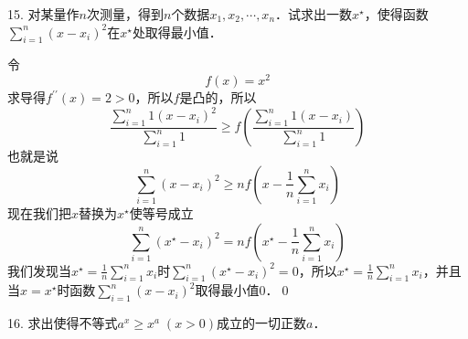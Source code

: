 15. 对某量作$n$次测量，得到$n$个数据$x_1,x_2,\cdots, x_n$．试求出一数$x^\star$，使得函数$\displaystyle\sum_{i=1}^n \left(x- x_i\right)^2$在$x^\star$处取得最小值．

\solve 令
\begin{equation}
    f(x) = x^2
\end{equation}
求导得$f^{\prime\prime}(x)=2>0$，所以$f$是凸的，所以
\begin{equation}
    \frac{\displaystyle\sum_{i=1}^n 1 \left(x-x_i\right)^2}{\displaystyle\sum_{i=1}^n 1} \geq f \left(\displaystyle\frac{\displaystyle\sum_{i=1}^n 1 \left(x-x_i\right)}{\displaystyle\sum_{i=1}^n 1}\right)
\end{equation}
也就是说
\begin{equation}
    \sum_{i=1}^n \left( x - x_i\right)^2 \geq n f(x - \frac{1}{n}\displaystyle\sum_{i=1}^n x_i)
\end{equation}
现在我们把$x$替换为$x^\star$使等号成立
\begin{equation}
    \sum_{i=1}^n \left(x^\star - x_i\right)^2 = n f \left(x^\star - \frac{1}{n} \displaystyle\sum_{i=1}^n x_i\right)
\end{equation}
我们发现当$x^\star = \displaystyle\frac{1}{n} \sum_{i=1}^n x_i$时$\displaystyle\sum_{i=1}^n \left(x^\star - x_i\right)^2 = 0$，所以$x^\star = \displaystyle\frac{1}{n} \displaystyle\sum_{i=1}^n x_i$，并且当$x = x^\star$时函数$\displaystyle\sum_{i=1}^n \left(x - x_i\right)^2$取得最小值$0$．\qed\bigskip

16. 求出使得不等式$a^x \geq x^a \; (x > 0)$成立的一切正数$a$．

